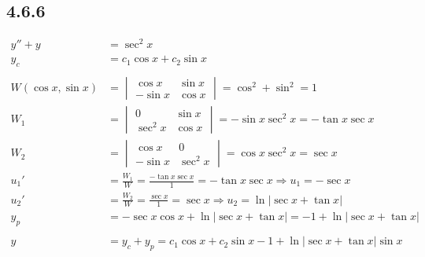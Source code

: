 \documentclass{article}
\begin{document}
\subsection{4.6.6}
\begin{align*}
    y''+y &= \sec^2x\\
    y_c &= c_1\cos x+c_2\sin x\\\\
    W(\cos x,\sin x)  &= \begin{vmatrix}\cos x & \sin x \\ -\sin x & \cos x \end{vmatrix} = \cos ^2+\sin ^2 = 1\\
    W_1 &= \begin{vmatrix} 0 & \sin x \\ \sec^2 x & \cos x\end{vmatrix} = -\sin x \sec^2x  =- \tan x \sec x\\
    W_2 &= \begin{vmatrix} \cos x & 0\\ -\sin x & \sec^2 x\end{vmatrix} = \cos x\sec^2x = \sec x\\
    u_1' &= \frac{W_1}{W} = \frac{-\tan x \sec x}{1} =  -\tan x\sec  x \Rightarrow u_1 =-\sec x\\
    u_2' &= \frac{W_2}{W} = \frac{\sec x }{1}  = \sec x \Rightarrow u_2  = \ln\left|\sec x + \tan x\right|\\
    y_p &= -\sec x \cos x + \ln\left|\sec x + \tan x\right| = -1+\ln\left|\sec x + \tan x\right|\\\\
    y &= y_c+y_p =  c_1\cos x+c_2\sin x  -1+\ln\left|\sec x + \tan x\right|\sin x
\end{align*}
\end{document}
